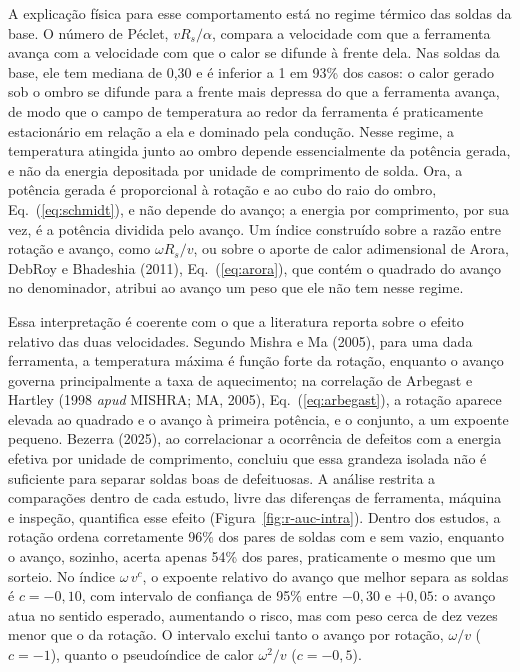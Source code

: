 \documentclass[12pt,openany]{report}
\begin{document}
A explicação física para esse comportamento está no regime térmico das soldas da base. O número de Péclet, $vR_s/\alpha$, compara a velocidade com que a ferramenta avança com a velocidade com que o calor se difunde à frente dela. Nas soldas da base, ele tem mediana de 0,30 e é inferior a 1 em 93\% dos casos: o calor gerado sob o ombro se difunde para a frente mais depressa do que a ferramenta avança, de modo que o campo de temperatura ao redor da ferramenta é praticamente estacionário em relação a ela e dominado pela condução. Nesse regime, a temperatura atingida junto ao ombro depende essencialmente da potência gerada, e não da energia depositada por unidade de comprimento de solda. Ora, a potência gerada é proporcional à rotação e ao cubo do raio do ombro, Eq.~(\ref{eq:schmidt}), e não depende do avanço; a energia por comprimento, por sua vez, é a potência dividida pelo avanço. Um índice construído sobre a razão entre rotação e avanço, como $\omega R_s/v$, ou sobre o aporte de calor adimensional de Arora, DebRoy e Bhadeshia (2011), Eq.~(\ref{eq:arora}), que contém o quadrado do avanço no denominador, atribui ao avanço um peso que ele não tem nesse regime.

Essa interpretação é coerente com o que a literatura reporta sobre o efeito relativo das duas velocidades. Segundo Mishra e Ma (2005), para uma dada ferramenta, a temperatura máxima é função forte da rotação, enquanto o avanço governa principalmente a taxa de aquecimento; na correlação de Arbegast e Hartley (1998 \textit{apud} MISHRA; MA, 2005), Eq.~(\ref{eq:arbegast}), a rotação aparece elevada ao quadrado e o avanço à primeira potência, e o conjunto, a um expoente pequeno. Bezerra (2025), ao correlacionar a ocorrência de defeitos com a energia efetiva por unidade de comprimento, concluiu que essa grandeza isolada não é suficiente para separar soldas boas de defeituosas. A análise restrita a comparações dentro de cada estudo, livre das diferenças de ferramenta, máquina e inspeção, quantifica esse efeito (Figura~\ref{fig:r-auc-intra}). Dentro dos estudos, a rotação ordena corretamente 96\% dos pares de soldas com e sem vazio, enquanto o avanço, sozinho, acerta apenas 54\% dos pares, praticamente o mesmo que um sorteio. No índice $\omega\,v^{c}$, o expoente relativo do avanço que melhor separa as soldas é $c = -0{,}10$, com intervalo de confiança de 95\% entre $-0{,}30$ e $+0{,}05$: o avanço atua no sentido esperado, aumentando o risco, mas com peso cerca de dez vezes menor que o da rotação. O intervalo exclui tanto o avanço por rotação, $\omega/v$ ($c = -1$), quanto o pseudoíndice de calor $\omega^{2}/v$ ($c = -0{,}5$).
\end{document}
